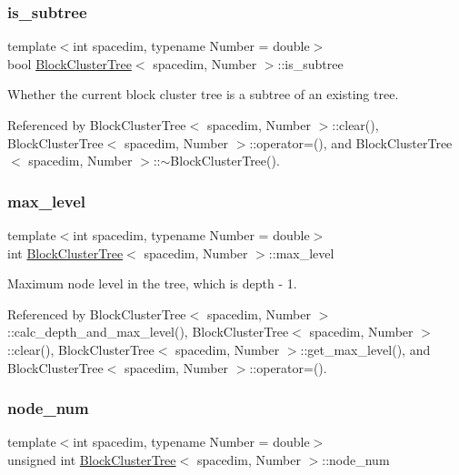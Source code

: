 \subsubsection{\texorpdfstring{is\+\_\+subtree}{is\_subtree}}
{\footnotesize\ttfamily template$<$int spacedim, typename Number = double$>$ \\
bool \hyperlink{classBlockClusterTree}{Block\+Cluster\+Tree}$<$ spacedim, Number $>$\+::is\+\_\+subtree\hspace{0.3cm}{\ttfamily [private]}}

Whether the current block cluster tree is a subtree of an existing tree. 

Referenced by Block\+Cluster\+Tree$<$ spacedim, Number $>$\+::clear(), Block\+Cluster\+Tree$<$ spacedim, Number $>$\+::operator=(), and Block\+Cluster\+Tree$<$ spacedim, Number $>$\+::$\sim$\+Block\+Cluster\+Tree().

\mbox{\label{classBlockClusterTree_a9151f138713d01c53ac17f004c7e6b62}} 
\subsubsection{\texorpdfstring{max\+\_\+level}{max\_level}}
{\footnotesize\ttfamily template$<$int spacedim, typename Number = double$>$ \\
int \hyperlink{classBlockClusterTree}{Block\+Cluster\+Tree}$<$ spacedim, Number $>$\+::max\+\_\+level\hspace{0.3cm}{\ttfamily [private]}}

Maximum node level in the tree, which is {\ttfamily depth} -\/ 1. 

Referenced by Block\+Cluster\+Tree$<$ spacedim, Number $>$\+::calc\+\_\+depth\+\_\+and\+\_\+max\+\_\+level(), Block\+Cluster\+Tree$<$ spacedim, Number $>$\+::clear(), Block\+Cluster\+Tree$<$ spacedim, Number $>$\+::get\+\_\+max\+\_\+level(), and Block\+Cluster\+Tree$<$ spacedim, Number $>$\+::operator=().

\mbox{\label{classBlockClusterTree_a75757146cea0aa0e9271b760b1d76307}} 
\subsubsection{\texorpdfstring{node\+\_\+num}{node\_num}}
{\footnotesize\ttfamily template$<$int spacedim, typename Number = double$>$ \\
unsigned int \hyperlink{classBlockClusterTree}{Block\+Cluster\+Tree}$<$ spacedim, Number $>$\+::node\+\_\+num\hspace{0.3cm}{\ttfamily [private]}}

